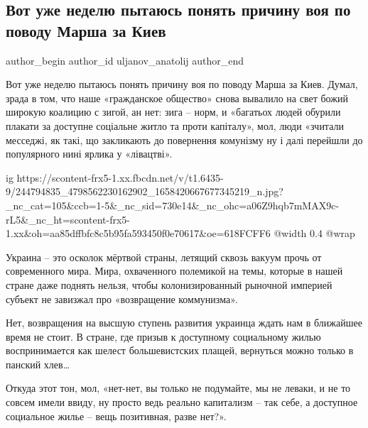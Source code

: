  
 
 
 
 
 
\subsection{Вот уже неделю пытаюсь понять причину воя по поводу Марша за Киев}
\label{sec:08_10_2021.fb.uljanov_anatolij.1.marsh_za_kiev}
 
\ifcmt
 author_begin
   author_id uljanov_anatolij
 author_end
\fi

Вот уже неделю пытаюсь понять причину воя по поводу Марша за Киев. Думал, зрада
в том, что наше «гражданское общество» снова вывалило на свет божий широкую
коалицию с зигой, ан нет: зига – норм, и «багатьох людей обурили плакати за
доступне соціальне житло та проти капіталу», мол, люди «зчитали месседжі, як
такі, що закликають до повернення комунізму ну і далі перейшли до популярного
нині ярлика у «лівацтві».

\ifcmt
  ig https://scontent-frx5-1.xx.fbcdn.net/v/t1.6435-9/244794835_4798562230162902_1658420667677345219_n.jpg?_nc_cat=105&ccb=1-5&_nc_sid=730e14&_nc_ohc=a06Z9hqb7mMAX9c-rL5&_nc_ht=scontent-frx5-1.xx&oh=aa85dffbfc8c5b95fa593450f0e70617&oe=618FCFF6
  @width 0.4
  @wrap 
\fi

Украина – это осколок мёртвой страны, летящий сквозь вакуум прочь от
современного мира. Мира, охваченного полемикой на темы, которые в нашей стране
даже поднять нельзя, чтобы колонизированный рыночной империей субъект не
завизжал про «возвращение коммунизма». 

Нет, возвращения на высшую ступень развития украинца ждать нам в ближайшее
время не стоит. В стране, где призыв к доступному социальному жилью
воспринимается как шелест большевистских плащей, вернуться можно только в
панский хлев…

Откуда этот тон, мол, «нет-нет, вы только не подумайте, мы не леваки, и не то
совсем имели ввиду, ну просто ведь реально капитализм – так себе, а доступное
социальное жилье – вещь позитивная, разве нет?». 

